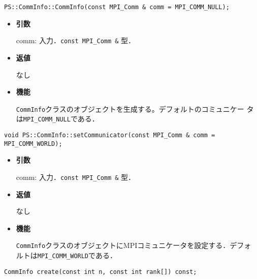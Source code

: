 

\begin{screen}
\begin{verbatim}
PS::CommInfo::CommInfo(const MPI_Comm & comm = MPI_COMM_NULL);
\end{verbatim}
\end{screen}

\begin{itemize}

\item {\bf 引数}

comm: 入力．{\tt const MPI\_Comm \&} 型．

\item {\bf 返値}

なし

\item {\bf 機能}

{\tt CommInfo}クラスのオブジェクトを生成する。デフォルトのコミュニケー
タは{\tt MPI\_COMM\_NULL}である．

\end{itemize}

\begin{screen}
\begin{verbatim}
void PS::CommInfo::setCommunicator(const MPI_Comm & comm = MPI_COMM_WORLD);
\end{verbatim}
\end{screen}

\begin{itemize}

\item {\bf 引数}

comm: 入力．{\tt const MPI\_Comm \&} 型．

\item {\bf 返値}

なし

\item {\bf 機能}

{\tt CommInfo}クラスのオブジェクトにMPIコミュニケータを設定する．デフォ
ルトは{\tt MPI\_COMM\_WORLD}である．

\end{itemize}

\begin{screen}
\begin{verbatim}
CommInfo create(const int n, const int rank[]) const;
\end{verbatim}
\end{screen}

